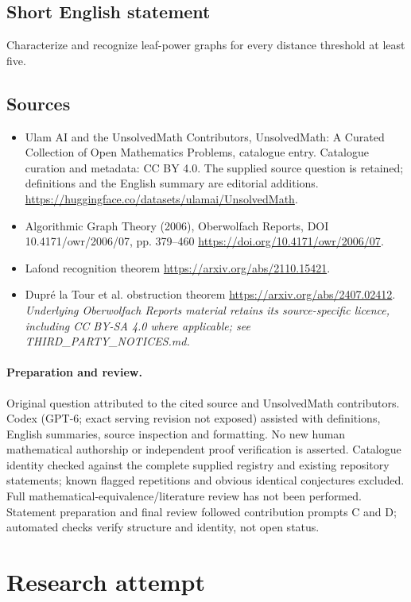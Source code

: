 \documentclass[11pt]{article}
\begin{document}
\subsection{Short English statement}
Characterize and recognize leaf-power graphs for every distance threshold at least five.
\subsection{Sources}
\begin{itemize}
\item[S1] Ulam AI and the UnsolvedMath Contributors, UnsolvedMath: A Curated Collection of Open Mathematics Problems, catalogue entry. Catalogue curation and metadata: CC BY 4.0. The supplied source question is retained; definitions and the English summary are editorial additions.
\url{https://huggingface.co/datasets/ulamai/UnsolvedMath}.
\item[S2] Algorithmic Graph Theory (2006), Oberwolfach Reports, DOI 10.4171/owr/2006/07, pp. 379--460
\url{https://doi.org/10.4171/owr/2006/07}.
\item[S3] Lafond recognition theorem
\url{https://arxiv.org/abs/2110.15421}.
\item[S4] Dupré la Tour et al. obstruction theorem
\url{https://arxiv.org/abs/2407.02412}.
\textit{Underlying Oberwolfach Reports material retains its source-specific licence, including CC BY-SA 4.0 where applicable; see THIRD\_PARTY\_NOTICES.md.}
\end{itemize}
\paragraph{Preparation and review.}
Original question attributed to the cited source and UnsolvedMath contributors. Codex (GPT-6; exact serving revision not exposed) assisted with definitions, English summaries, source inspection and formatting. No new human mathematical authorship or independent proof verification is asserted. Catalogue identity checked against the complete supplied registry and existing repository statements; known flagged repetitions and obvious identical conjectures excluded. Full mathematical-equivalence/literature review has not been performed. Statement preparation and final review followed contribution prompts C and D; automated checks verify structure and identity, not open status.
\label{end:statement}

\section{Research attempt}
\end{document}
